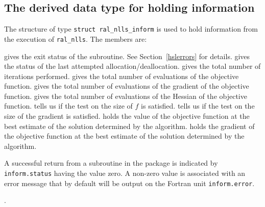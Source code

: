 \documentclass{spec}
\begin{document}
\subsection{The derived data type for holding information}
\label{typeinform}
The structure of type {\tt struct ral\_nlls\_inform} is used
to hold information from the execution of {\tt ral\_nlls}.
The members are:
\begin{description}
 gives the exit status of the subroutine.  See Section~\ref{hslerrors} for details.
 gives the status of the last attempted allocation/deallocation.
 gives the total number of iterations performed.
 gives the total number of evaluations of the objective function.
 gives the total number of evaluations of the gradient of the objective function.
 gives the total number of evaluations of the Hessian of the objective function.
 tells us if the test on the size of \(f\) is satisfied.
 tells us if the test on the size of the gradient is satisfied.
 holds the value of the objective function at the best estimate of the solution determined by the algorithm.
 holds the gradient of the objective function at the best estimate of the solution determined by the algorithm.
\end{description}


\hslerrors

A successful return from a subroutine in the package is indicated by
{\tt inform.status} having the value zero.
A non-zero value is associated with an error message that by default will
be output on the Fortran unit {\tt inform.error}.



\hslgeneral

.

\hslmethod
\label{method}



\hslexample




\end{document}
